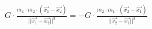 
$ 
G \cdot \frac{m_{1} \cdot m_{2} \cdot ( \overrightarrow{x_{1}} - \overrightarrow{x_{2}}) } { || \overrightarrow{x_{1}} - \overrightarrow{x_{2}} || ^{3} }
= -
G \cdot \frac{m_{2} \cdot m_{1} \cdot ( \overrightarrow{x_{2}} - \overrightarrow{x_{1}}) } { || \overrightarrow{x_{2}} - \overrightarrow{x_{1}} || ^{3} }
$